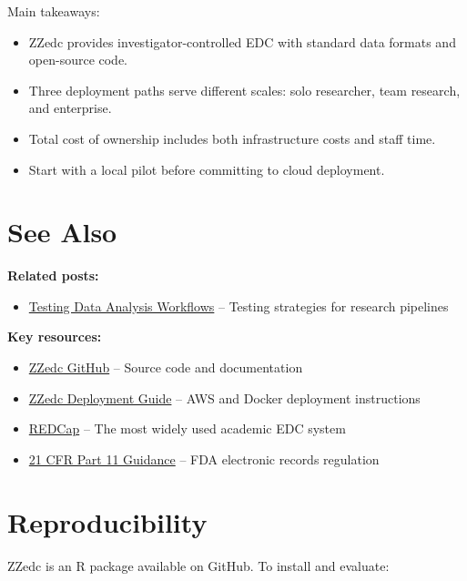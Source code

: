 \documentclass[
  letterpaper,
  DIV=11,
  numbers=noendperiod]{scrartcl}
\providecommand{\tightlist}{%
  \setlength{\itemsep}{0pt}\setlength{\parskip}{0pt}}
\begin{document}
Main takeaways:

\begin{itemize}
\tightlist
\item
  ZZedc provides investigator-controlled EDC with standard data formats
  and open-source code.
\item
  Three deployment paths serve different scales: solo researcher, team
  research, and enterprise.
\item
  Total cost of ownership includes both infrastructure costs and staff
  time.
\item
  Start with a local pilot before committing to cloud deployment.
\end{itemize}

\section{See Also}\label{see-also}

\textbf{Related posts:}

\begin{itemize}
\tightlist
\item
  \href{../40-testingfordataanalysisworkflow/}{Testing Data Analysis
  Workflows} -- Testing strategies for research pipelines
\end{itemize}

\textbf{Key resources:}

\begin{itemize}
\tightlist
\item
  \href{https://github.com/rgt47/zzedc}{ZZedc GitHub} -- Source code and
  documentation
\item
  \href{https://github.com/rgt47/zzedc/tree/main/\%20deployment}{ZZedc
  Deployment Guide} -- AWS and Docker deployment instructions
\item
  \href{https://www.project-redcap.org/}{REDCap} -- The most widely used
  academic EDC system
\item
  \href{https://www.fda.gov/regulatory-information/\%20search-fda-guidance-documents}{21
  CFR Part 11 Guidance} -- FDA electronic records regulation
\end{itemize}

\section{Reproducibility}\label{reproducibility}

ZZedc is an R package available on GitHub. To install and evaluate:
\end{document}

